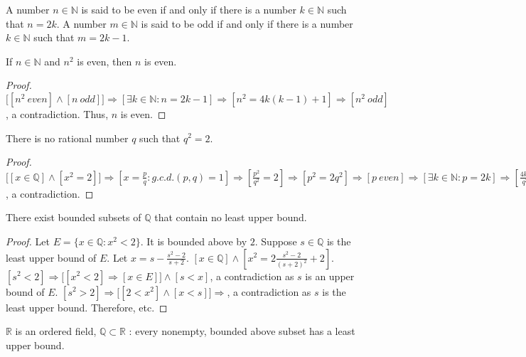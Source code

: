             \begin{definition}
            A number $n\in \mathbb{N}$ is said to be even if and only if there is a number $k\in \mathbb{N}$ such that $n=2k$. A number $m\in \mathbb{N}$ is said to be odd if and only if there is a number $k\in \mathbb{N}$ such that $m=2k-1$.
            \end{definition}
            \begin{theorem}
            If $n\in \mathbb{N}$ and $n^2$ is even, then $n$ is even.
            \end{theorem}
            \begin{proof}
            $\big[[n^2\ even]\land [n\ odd]\big]\Rightarrow [\exists k\in \mathbb{N}:n=2k-1]\Rightarrow [n^2 = 4k(k-1)+1]\Rightarrow [n^2\ odd]$, a contradiction. Thus, $n$ is even.
            \end{proof}
            \begin{theorem}
            There is no rational number $q$ such that $q^2 = 2$.
            \end{theorem}
            \begin{proof}
            $\big[[x\in \mathbb{Q}]\land [x^2=2]\big]\Rightarrow [x= \frac{p}{q}:g.c.d.(p,q)=1]\Rightarrow [\frac{p^2}{q^2}= 2]\Rightarrow [p^2 = 2q^2]\Rightarrow [p\ even]\Rightarrow [\exists k\in \mathbb{N}:p=2k]\Rightarrow [\frac{4k^2}{q^2}=2]\Rightarrow [q^2 = 2k^2]\Rightarrow [q\ even]\Rightarrow [g.c.d.(p,q)\geq 2]$, a contradiction.
            \end{proof}
            \begin{theorem}
            There exist bounded subsets of $\mathbb{Q}$ that contain no least upper bound.
            \end{theorem}
            \begin{proof}
            Let $E=\{x\in \mathbb{Q}:x^2 < 2\}$. It is bounded above by $2$. Suppose $s\in \mathbb{Q}$ is the least upper bound of $E$. Let $x = s - \frac{s^2-2}{s+2}$. $[x\in \mathbb{Q}] \land [x^2 = 2\frac{s^2-2}{(s+2)^2}+2]$. $[s^2<2]\Rightarrow \big[[x^2<2 ]\Rightarrow [x\in E]\big]\land [s<x]$, a contradiction as $s$ is an upper bound of $E$. $[s^2>2]\Rightarrow \big[[2<x^2 ]\land [x<s]\big]\Rightarrow$, a contradiction as $s$ is the least upper bound. Therefore, etc.
            \end{proof}
            \begin{definition}
            $\mathbb{R}$ is an ordered field, $\mathbb{Q}\subset \mathbb{R}$ : every nonempty, bounded above subset has a least upper bound.
            \end{definition}
